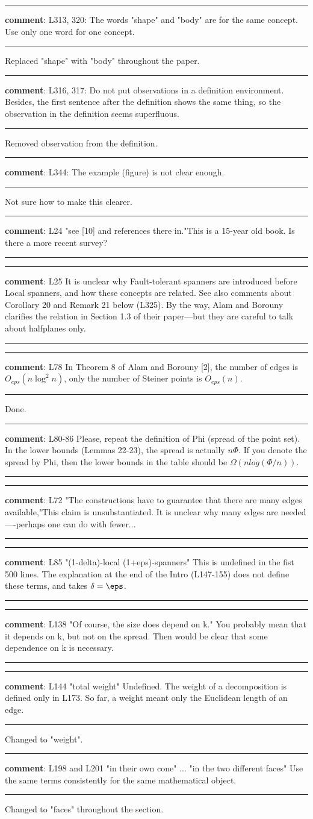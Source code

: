 \documentclass[12pt]{article}%
\newcommand{\hr}{\noindent \rule{\linewidth}{0.2mm}}%
\newcommand{\Hr}{\noindent \rule{\linewidth}{0.6mm}}%
\newcommand{\reviewCX}[1]{%

   \bigskip%
   \noindent%
   \Hr

   \bigskip%
   \noindent%
   \textbf{comment}: #1

   \noindent%
   \hr }
\begin{document}
\reviewCX{L313, 320: The words "shape" and "body" are for the same concept. Use only one word for one concept.} Replaced "shape" with "body" throughout the paper.

\reviewCX{L316, 317: Do not put observations in a definition environment. Besides, the first sentence after the definition shows the same thing, so the observation in the definition seems superfluous.} Removed observation from the definition.

\reviewCX{L344: The example (figure) is not clear enough.}
Not sure how to make this clearer.

\reviewCX{L24 "see [10] and references there in."This is a 15-year old book. Is there a more recent survey?} 

\reviewCX{L25 It is unclear why Fault-tolerant spanners are introduced before Local spanners, and how these concepts are related. See also comments about Corollary 20 and Remark 21 below (L325). By the way, Alam and Borouny clarifies the relation in Section 1.3 of their paper---but they are careful to talk about halfplanes only.}

\reviewCX{L78 In Theorem 8 of Alam and Borouny [2], the number of edges is $O_{eps}(n \log^2 n)$, only the number of Steiner points is $O_{eps}(n)$.} Done.

\reviewCX{L80-86 Please, repeat the definition of Phi (spread of the point set). In the lower bounds (Lemmas 22-23), the spread is actually $n\Phi$. If you denote the spread by Phi, then the lower bounds in the table should be $\Omega(n log (\Phi/n))$.}

\reviewCX{L72 "The constructions have to guarantee that there are many edges available,"This claim is unsubstantiated. It is unclear why many edges are needed----perhaps one can do with fewer...}

\reviewCX{L85 "(1-delta)-local (1+eps)-spanners" This is undefined in the fist 500 lines. The explanation at the end of the Intro (L147-155) does not define these terms, and takes $\delta=\eps$.}

\reviewCX{L138 "Of course, the size does depend on k." You probably mean that it depends on k, but not on the spread. Then would be clear that some dependence on k is necessary.}

\reviewCX{L144 "total weight" Undefined. The weight of a decomposition is defined only in L173. So far, a weight meant only the Euclidean length of an edge.} Changed to "weight".

\reviewCX{L198 and L201 "in their own cone" ... "in the two different faces" Use the same terms consistently for the same mathematical object.} Changed to "faces" throughout the section.
\end{document}
